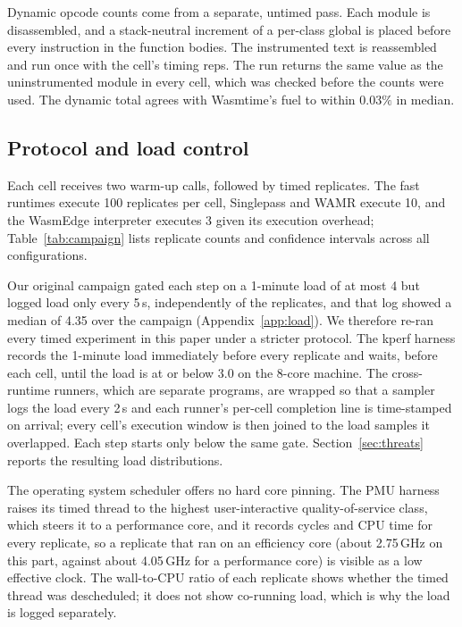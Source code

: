 \documentclass{ws-jcsc}
\begin{document}


Dynamic opcode counts come from a separate, untimed pass. Each module is disassembled, and a stack-neutral increment of a per-class global is placed before every instruction in the function bodies. The instrumented text is reassembled and run once with the cell's timing reps. The run returns the same value as the uninstrumented module in every cell, which was checked before the counts were used. The dynamic total agrees with Wasmtime's fuel to within $0.03\%$ in median.

\subsection{Protocol and load control}
\label{sec:protocol}
Each cell receives two warm-up calls, followed by timed replicates. The fast runtimes execute 100 replicates per cell, Singlepass and WAMR execute 10, and the WasmEdge interpreter executes 3 given its execution overhead; Table~\ref{tab:campaign} lists replicate counts and confidence intervals across all configurations.

Our original campaign gated each step on a 1-minute load of at most 4 but logged load only every 5\,s, independently of the replicates, and that log showed a median of 4.35 over the campaign (Appendix~\ref{app:load}). We therefore re-ran every timed experiment in this paper under a stricter protocol. The kperf harness records the 1-minute load immediately before every replicate and waits, before each cell, until the load is at or below 3.0 on the 8-core machine. The cross-runtime runners, which are separate programs, are wrapped so that a sampler logs the load every 2\,s and each runner's per-cell completion line is time-stamped on arrival; every cell's execution window is then joined to the load samples it overlapped. Each step starts only below the same gate. Section~\ref{sec:threats} reports the resulting load distributions.

The operating system scheduler offers no hard core pinning. The PMU harness raises its timed thread to the highest user-interactive quality-of-service class, which steers it to a performance core, and it records cycles and CPU time for every replicate, so a replicate that ran on an efficiency core (about 2.75\,GHz on this part, against about 4.05\,GHz for a performance core) is visible as a low effective clock. The wall-to-CPU ratio of each replicate shows whether the timed thread was descheduled; it does not show co-running load, which is why the load is logged separately.
\end{document}
